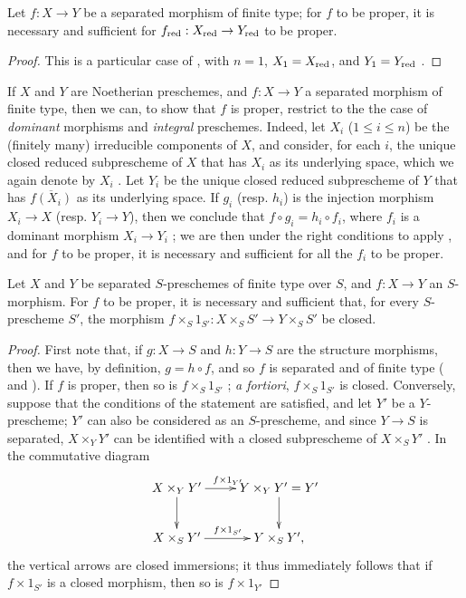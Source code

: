 \begin{corollary}[5.4.6]
\label{II.5.4.6}
Let $f:X\to Y$ be a separated morphism of finite type; for $f$ to be proper, it is necessary and sufficient for $f_\red:X_\red\to Y_\red$ to be proper.
\end{corollary}

\begin{proof}
This is a particular case of , with $n=1$, $X_1=X_{\mathrm{red}}$, and $Y_1=Y_{\mathrm{red}}$ .
\end{proof}

\begin{env}[5.4.7]
\label{II.5.4.7}
If $X$ and $Y$ are Noetherian preschemes, and $f:X\to Y$ a separated morphism of finite type, then we can, to show that $f$ is proper, restrict to the the case of \emph{dominant} morphisms and \emph{integral} preschemes.
Indeed, let $X_i$ ($1\leq i\leq n$) be the (finitely many) irreducible components of $X$, and consider, for each $i$, the unique closed reduced subprescheme of $X$ that has $X_i$ as its underlying space, which we again denote by $X_i$ .
Let $Y_i$ be the unique closed reduced subprescheme of $Y$ that has $\overline{f(X_i)}$ as its underlying space.
If $g_i$ (resp. $h_i$) is the injection morphism $X_i\to X$ (resp. $Y_i\to Y$), then we conclude that $f\circ g_i=h_i\circ f_i$, where $f_i$ is a dominant morphism $X_i\to Y_i$ ;
we are then under the right conditions to apply , and for $f$ to be proper, it is necessary and sufficient for all the $f_i$ to be proper.
\end{env}

\begin{corollary}[5.4.8]
\label{II.5.4.8}
Let $X$ and $Y$ be separated $S$-preschemes of finite type over $S$, and $f:X\to Y$ an $S$-morphism.
For $f$ to be proper, it is necessary and sufficient that, for every $S$-prescheme $S'$, the morphism $f\times_S 1_{S'}:X\times_S S'\to Y\times_S S'$ be closed.
\end{corollary}

\begin{proof}
First note that, if $g:X\to S$ and $h:Y\to S$ are the structure morphisms, then we have, by definition, $g=h\circ f$, and so $f$ is separated and of finite type ( and ).
If $f$ is proper, then so is $f\times_S 1_{S'}$ ; \emph{a fortiori}, $f\times_S 1_{S'}$ is closed.
Conversely, suppose that the conditions of the statement are satisfied, and let $Y'$ be a $Y$-prescheme;
$Y'$ can also be considered as an $S$-prescheme, and since $Y\to S$ is separated, $X\times_Y Y'$ can be identified with a closed subprescheme of $X\times_S Y'$ .
In the commutative diagram
\[
  \xymatrix{
    X\times_Y Y'\ar[r]^{f\times1_{Y'}}\ar[d] &
    Y\times_Y Y'=Y'\ar[d]\\
    X\times_S Y'\ar[r]^{f\times1_{S'}} &
    Y\times_S Y',
  }
\]
the vertical arrows are closed immersions; it thus immediately follows that if $f\times1_{S'}$ is a closed morphism, then so is $f\times1_{Y'}$
\end{proof}


